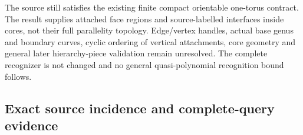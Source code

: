 The source still satisfies the existing finite compact orientable one-torus
contract. The result supplies attached face regions and source-labelled
interfaces inside cores, not their full parallelity topology. Edge/vertex
handles, actual base genus and boundary curves, cyclic ordering of vertical
attachments, core geometry and general later hierarchy-piece validation
remain unresolved. The complete recognizer is not changed and no general
quasi-polynomial recognition bound follows.

\subsection{Exact source incidence and complete-query evidence}


